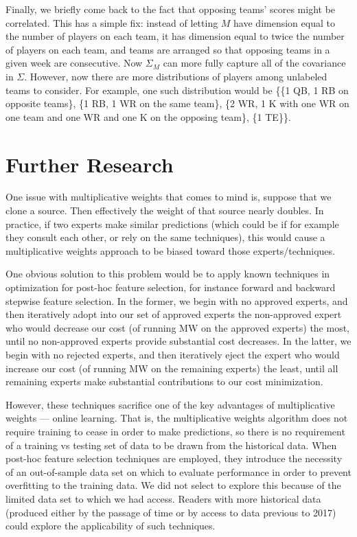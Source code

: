 \documentclass[12pt, final, onecolumn, titlepage]{article}
\theoremstyle{definition}
\begin{document}
Finally, we briefly come back to the fact that opposing teams' scores might be correlated. This has a simple fix: instead of letting $M$ have dimension equal to the number of players on each team, it has dimension equal to twice the number of players on each team, and teams are arranged so that opposing teams in a given week are consecutive. Now $\Sigma_M$ can more fully capture all of the covariance in $\Sigma$. However, now there are more distributions of players among unlabeled teams to consider. For example, one such distribution would be \{\{1 QB, 1 RB on opposite teams\}, \{1 RB, 1 WR on the same team\}, \{2 WR, 1 K with one WR on one team and one WR and one K on the opposing team\}, \{1 TE\}\}.

\section{Further Research}
One issue with multiplicative weights that comes to mind is, suppose that we clone a source. Then effectively the weight of that source nearly doubles. In practice, if two experts make similar predictions (which could be if for example they consult each other, or rely on the same techniques), this would cause a multiplicative weights approach to be biased toward those experts/techniques.

One obvious solution to this problem would be to apply known techniques in optimization for post-hoc feature selection, for instance forward and backward stepwise feature selection. In the former, we begin with no approved experts, and then iteratively adopt into our set of approved experts the non-approved expert who would decrease our cost (of running MW on the approved experts) the most, until no non-approved experts provide substantial cost decreases. In the latter, we begin with no rejected experts, and then iteratively eject the expert who would increase our cost (of running MW on the remaining experts) the least, until all remaining experts make substantial contributions to our cost minimization.

However, these techniques sacrifice one of the key advantages of multiplicative weights --- online learning. That is, the multiplicative weights algorithm does not require training to cease in order to make predictions, so there is no requirement of a training vs testing set of data to be drawn from the historical data. When post-hoc feature selection techniques are employed, they introduce the necessity of an out-of-sample data set on which to evaluate performance in order to prevent overfitting to the training data. We did not select to explore this because of the limited data set to which we had access. Readers with more historical data (produced either by the passage of time or by access to data previous to 2017) could explore the applicability of such techniques.
\end{document}
